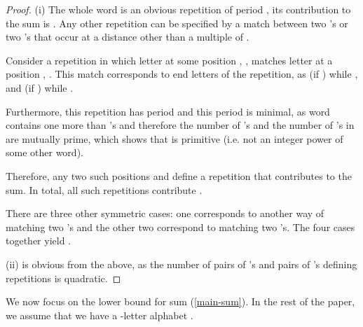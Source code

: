 \documentclass[11pt]{article}
\begin{document}
\begin{proof}
(i) The whole word  is an obvious repetition of period , its contribution to
the sum 
is . Any other repetition can be specified by a
match between two 's or two 's that occur at a distance other
than a multiple of . 

Consider a repetition  in which letter  at some position ,
, 
matches letter  at a position , . This match corresponds to end letters of the repetition,
as  (if ) while , and 
(if ) while . 

Furthermore, this repetition has period  and this period
is minimal, as word  contains one more  than 's
and therefore the number of 's and the number of 's in  are
mutually prime, which shows that  is primitive (i.e. not
an integer power of some other word). 

Therefore, any two such positions  and  define a repetition that contributes
 to the sum. 
In total, all such repetitions contribute .

There are three other symmetric cases: one corresponds to another way
of matching two 's and the other two correspond to matching two 's. 
The four cases together yield
. 

(ii) is obvious from the above, as the number of pairs of 's and
pairs of 's defining repetitions is quadratic. 
\end{proof}

We now focus on the lower bound for sum (\ref{main-sum}). 
In the rest of the paper, we assume that we have a -letter alphabet
. 
\end{document}
